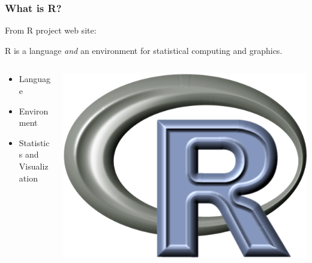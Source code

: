 \documentclass{beamer}\usepackage[]{graphicx}\usepackage[]{color}
\begin{document}
\begin{frame}
\frametitle{What is R?}

From R project web site:\vfill

R is a language \emph{and} an environment for statistical computing and graphics. \vfill
\begin{columns}[T]
	\begin{column}{.5\textwidth}
		\begin{itemize}
		\vspace{.5em} \item Language %
		\vspace{.5em} \item Environment %
		\vspace{.5em} \item Statistics and Visualization %
		\end{itemize}
	\end{column}

	\begin{column}{.5\textwidth}
		\includegraphics[width=\textwidth]{./figures/R.png}
	\end{column}
\end{columns}	
\vfill

\end{frame}
\end{document}
